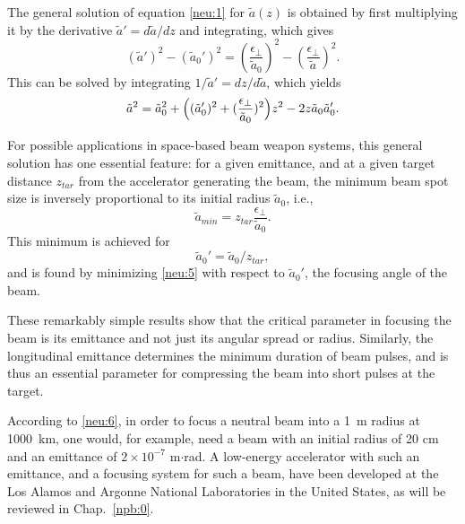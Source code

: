 \documentclass [12pt,a4paper,     ]{report} %
\begin{document}
  The general solution of equation \eqref{neu:1} for $\tilde{a}(z)$ is obtained by first multiplying it by the derivative $\tilde{a}'= d\tilde{a}/dz$ and integrating, which gives
%
\begin{equation}\label{neu:4} %
         (\tilde{a}'  )^2
       - (\tilde{a}_0')^2
       = (\frac{\epsilon_{\perp}}{\tilde{a}_0})^2
       - (\frac{\epsilon_{\perp}}{\tilde{a}  })^2.
\end{equation}
%
This can be solved by integrating $1/\tilde{a}' = dz/d\tilde{a}$, which yields 
%
\begin{equation}\label{neu:5} %
         \tilde{a}^2  = \tilde{a}_0^2
   + \Bigl( (\tilde{a}_0')^2 +(\frac{\epsilon_{\perp}}{\tilde{a}_0})^2 \Bigr) z^2
              - 2 z\tilde{a}_0 \tilde{a}_0'.
\end{equation}
%

	For possible applications in space-based beam weapon systems, this general solution has one essential feature: for a given emittance, and at a given target distance $z_{tar}$ from the accelerator generating the beam, the minimum beam spot size is inversely proportional to its initial radius $\tilde{a}_{0}$, i.e.,
%
\begin{equation}\label{neu:6} %
       \tilde{a}_{min} = z_{tar}\frac{\epsilon_{\perp}}{\tilde{a}_{0}}.
\end{equation}
%
This minimum is achieved for 
%
\begin{equation}\label{neu:7} %
                  \tilde{a}_{0}'=\tilde{a}_{0}/z_{tar},
\end{equation}
%
and is found by minimizing \eqref{neu:5} with respect to $\tilde{a}_{0}'$, the focusing angle of the beam.

  These remarkably simple results show that the critical parameter in focusing the beam is its emittance and not just its angular spread or radius. Similarly, the longitudinal emittance determines the minimum duration of beam pulses, and is thus an essential parameter for compressing the beam into short pulses at the target.

  According to \eqref{neu:6}, in order to focus a neutral beam into a 1~m radius at 1000~km, one would, for example, need a beam with an initial radius of 20 cm and an emittance of $2 \times 10^{-7}$ m$\cdot$rad.  A low-energy accelerator with such an emittance, and a focusing system for such a beam, have been developed at the Los Alamos and Argonne National Laboratories in the United States, as will be reviewed in Chap.~\ref{npb:0}.
\end{document}
